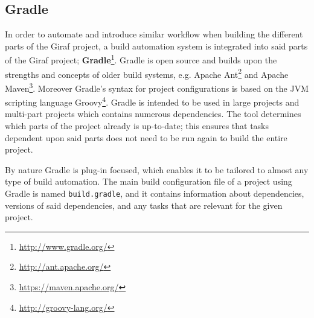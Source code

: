 \subsection*{Gradle}
In order to automate and introduce similar workflow when building the different parts of the Giraf project, a build automation system is integrated into said parts of the Giraf project; \textbf{Gradle}\footnote{\url{http://www.gradle.org/}}.
Gradle is open source and builds upon the strengths and concepts of older build systems, e.g. Apache Ant\footnote{\url{http://ant.apache.org/}} and Apache Maven\footnote{\url{https://maven.apache.org/}}.
Moreover Gradle's syntax for project configurations is based on the JVM scripting language Groovy\footnote{\url{http://groovy-lang.org/}}.
Gradle is intended to be used in large projects and multi-part projects which contains numerous dependencies.
The tool determines which parts of the project already is up-to-date; this ensures that tasks dependent upon said parts does not need to be run again to build the entire project. 

By nature Gradle is plug-in focused, which enables it to be tailored to almost any type of build automation.
The main build configuration file of a project using Gradle is named \texttt{build.gradle}, and it contains information about dependencies, versions of said dependencies, and any tasks that are relevant for the given project.